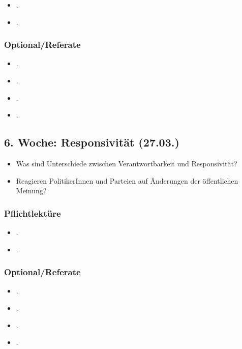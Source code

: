\documentclass[abstract=on,parskip=full,headings=standardclasses,fontsize=11pt,paper=a4]{scrartcl}
\begin{document}
\begin{itemize}
\item {}.
\item {}.
\end{itemize}


\subsubsection*{Optional/Referate}
\begin{itemize}
\item {}.
\item {}.
\item {}.
\item {}.
\end{itemize}


\subsection{6. Woche: Responsivität (27.03.)}

\begin{itemize}
\renewcommand\labelitemi{--}
\item Was sind Unterschiede zwischen Verantwortbarkeit und Responsivität? 
\item Reagieren PolitikerInnen und Parteien auf Änderungen der öffentlichen Meinung?
\end{itemize}

\subsubsection*{Pflichtlektüre}
\begin{itemize}
\item {}.
\item {}.
\end{itemize}

\subsubsection*{Optional/Referate}
\begin{itemize}
\item {}.
\item {}.
\item {}.
\item {}.
\end{itemize}
\end{document}
